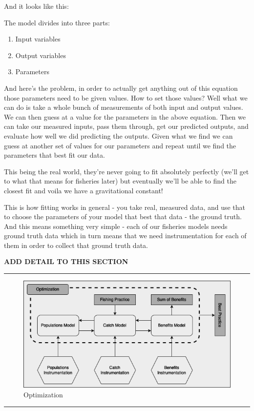 \documentclass[11pt,a5paper]{book}
\begin{document}
And it looks like this:
\newline

The model divides into three parts:

\begin{enumerate}
\item Input variables
\item Output variables
\item Parameters
\end{enumerate}

And here's the problem, in order to actually get anything out of this equation those parameters need to be given values. How to set those values? Well what we can do is take a whole bunch of measurements of both input and output values. We can then guess at a value for the parameters in the above equation. Then we can take our measured inputs, pass them through, get our predicted outputs, and evaluate how well we did predicting the outputs. Given what we find we can guess at another set of values for our parameters and repeat until we find the parameters that best fit our data. 
\newline

This being the real world, they're never going to fit absolutely perfectly (we'll get to what that means for fisheries later) but eventually we'll be able to find the closest fit and voila we have a gravitational constant!
\newline

This is how fitting works in general - you take real, measured data, and use that to choose the parameters of your model that best that data - the ground truth. And this means something very simple - each of our fisheries models needs ground truth data which in turn means that we need instrumentation for each of them in order to collect that ground truth data. 
\newline

\textbf{ADD DETAIL TO THIS SECTION}
\newpage

\noindent \rule{\textwidth}{0.5pt} 
\begin{figure}[h!] 
  \includegraphics[width=\linewidth]{drawings/high_level_optimization.png}
  \caption{Optimization}
  \label{fig:high_level_optimization}
\end{figure}
\newline
\rule{\textwidth}{0.5pt} 
\vspace{5pt}
\end{document}
